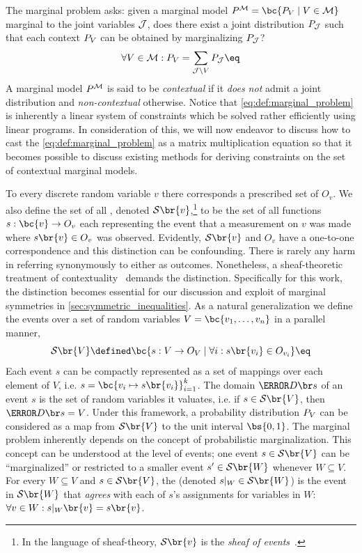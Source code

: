 \documentclass[aps, 10pt, english, twoside, pra, nofootinbib, tightenlines, longbibliography, superscriptaddress]{revtex4-1}
\renewcommand{\Events}[1]{\mathcal{S}\br{#1}} %
\begin{document}
    The marginal problem asks: given a marginal model $\prob^{\mscenario} = \bc{\prob[V] \mid V \in \mscenario}$ marginal to the joint variables $\mathcal{J}$, does there exist a joint distribution $\prob[\jointvar]$ such that each context $\prob[V]$ can be obtained by marginalizing $\prob[\jointvar]$?
    \[ \forall V \in \mscenario : \prob[V] = \sum_{\jointvar \setminus V} \prob[\jointvar] \eq \label{eq:def:marginal_problem}\]
    A marginal model $\prob^{\mscenario}$ is said to be \textit{contextual} if it \textit{does not} admit a joint distribution and \textit{non-contextual} otherwise. Notice that \cref{eq:def:marginal_problem} is inherently a linear system of constraints which be solved rather efficiently using linear programs. In consideration of this, we will now endeavor to discuss how to cast the \cref{eq:def:marginal_problem} as a matrix multiplication equation so that it becomes possible to discuss existing methods for deriving constraints on the set of contextual marginal models.

    To every discrete random variable $v$ there corresponds a prescribed set of  $O_v$. We also define the set of all , denoted $\Events{v}$,\footnote{In the language of sheaf-theory, $\Events{v}$ is the \textit{sheaf of events}~\cite{Abramsky_2011}.} to be the set of all functions $s : \bc{v} \to O_v$ each representing the event that a measurement on $v$ was made where $s\br{v} \in O_v$ was observed. Evidently, $\Events{v}$ and $O_v$ have a one-to-one correspondence and this distinction can be confounding. There is rarely any harm in referring synonymously to either as outcomes. Nonetheless, a sheaf-theoretic treatment of contextuality~\cite{Abramsky_2011} demands the distinction.
    Specifically for this work, the distinction becomes essential for our discussion and exploit of marginal symmetries in \cref{sec:symmetric_inequalities}. As a natural generalization we define the events over a set of random variables $V = \bc{v_1, \ldots, v_n}$ in a parallel manner,
    \[ \Events{V} \defined \bc{s: V \to O_{V} \mid \forall i : s\br{v_i} \in O_{v_i} } \eq \label{eq:outcome_space}\]
    Each event $s$ can be compactly represented as a set of mappings over each element of $V$, i.e. $s = \bc{v_i\mapsto s\br{v_i}}_{i = 1}^{k}$. The domain $\Dom{s}$ of an event $s$ is the set of random variables it valuates, i.e. if $s \in \Events{V}$, then $\Dom{s} = V$. Under this framework, a probability distribution $\prob[V]$ can be considered as a map from $\Events{V}$ to the unit interval $\bs{0,1}$.
    The marginal problem inherently depends on the concept of probabilistic marginalization. This concept can be understood at the level of events; one event $s \in \Events{V}$ can be ``marginalized'' or restricted to a smaller event $s' \in \Events{W}$ whenever $W \subseteq V$. For every $W \subseteq V$ and $s \in \Events{V}$, the  (denoted $s|_{W} \in \Events{W}$) is the event in $\Events{W}$ that \textit{agrees} with each of $s$'s assignments for variables in $W$: $\forall v \in W : s|_{W}\br{v} = s\br{v}$.
\end{document}
